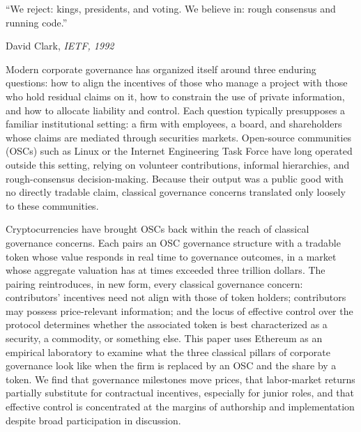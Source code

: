 \documentclass[No]{AEA}
\begin{document}
\setcounter{page}{1}




\epigraph{``We reject: kings, presidents, and voting. We believe in: rough consensus and running code.''}{David Clark, \textit{IETF, 1992}}

Modern corporate governance has organized itself around three enduring questions: how to align the incentives of those who manage a project with those who hold residual claims on it, how to constrain the use of private information, and how to allocate liability and control. Each question typically presupposes a familiar institutional setting: a firm with employees, a board, and shareholders whose claims are mediated through securities markets. Open-source communities (OSCs) such as Linux or the Internet Engineering Task Force have long operated outside this setting, relying on volunteer contributions, informal hierarchies, and rough-consensus decision-making. Because their output was a public good with no directly tradable claim, classical governance concerns translated only loosely to these communities.

Cryptocurrencies have brought OSCs back within the reach of classical governance concerns. Each pairs an OSC governance structure with a tradable token whose value responds in real time to governance outcomes, in a market whose aggregate valuation has at times exceeded three trillion dollars. The pairing reintroduces, in new form, every classical governance concern: contributors' incentives need not align with those of token holders; contributors may possess price-relevant information; and the locus of effective control over the protocol determines whether the associated token is best characterized as a security, a commodity, or something else. This paper uses Ethereum as an empirical laboratory to examine what the three classical pillars of corporate governance look like when the firm is replaced by an OSC and the share by a token. We find that governance milestones move prices, that labor-market returns partially substitute for contractual incentives, especially for junior roles, and that effective control is concentrated at the margins of authorship and implementation despite broad participation in discussion.
\end{document}

